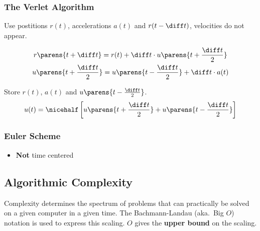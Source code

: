 		\subsubsection{The Verlet Algorithm} %
			Use postitions $r(t)$, accelerations $a(t)$ and $r(t-\diff t)$, velocities do not appear.
			
			\begin{gather*}
				r \parens{t + \diff t} = r(t) + \diff t \cdot u \parens{t + \frac{\diff t}{2}} \\
				u \parens{t + \frac{\diff t}{2}} = u \parens{t - \frac{\diff t}{2}} + \diff t \cdot a(t)
			\end{gather*}
			
			Store $r(t)$, $a(t)$ and $u \parens{t-\frac{\diff t}{2}}$.
			\[
				u(t) = \nicehalf \left[
					u \parens{t + \frac{\diff t}{2}} + u \parens{t - \frac{\diff t}{2}}
				\right]
			\]
		
		\subsubsection{Euler Scheme} %
			
			\begin{itemize}
				\item \textbf{Not} time centered
			\end{itemize}
			
		
	
	\subsection{Algorithmic Complexity} %
		Complexity determines the spectrum of problems that can practically be solved on a given computer in a given time. The Bachmann-Landau (aka.~Big $O$) notation is used to express this scaling.
		$O$ gives the \textbf{upper bound} on the scaling.
	
